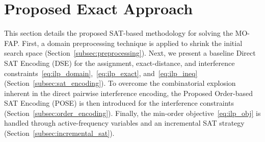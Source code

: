 {%
}
\caption{Visualization of the four relative positions between the forbidden interval $[D_{v,j}-d_{vw},D_{v,j}+d_{vw}]$ and the domain $D_w$. Red segments denote forbidden frequencies of $w$, whereas green segments denote admissible frequencies. Cases 1--3 are encoded by the boundary implications in~\eqref{eq:forbid_1}--\eqref{eq:forbid_3}. In Case 4, all frequencies in $D_w$ are forbidden, so $D_{v,j}$ is removed from $D_v$ by preprocessing.}


\section{Proposed Exact Approach}
\label{sec:method}
This section details the proposed SAT-based methodology for solving the MO-FAP.
First, a domain preprocessing technique is applied to shrink the initial search space (Section~\ref{subsec:preprocessing}).
Next, we present a baseline Direct SAT Encoding (DSE) for the assignment, exact-distance, and interference constraints~\eqref{eq:ilp_domain},~\eqref{eq:ilp_exact}, and~\eqref{eq:ilp_ineq} (Section~\ref{subsec:sat_encoding}).
To overcome the combinatorial explosion inherent in the direct pairwise interference encoding, the Proposed Order-based SAT Encoding (POSE) is then introduced for the interference constraints (Section~\ref{subsec:order_encoding}).
Finally, the min-order objective~\eqref{eq:ilp_obj} is handled through active-frequency variables and an incremental SAT strategy (Section~\ref{subsec:incremental_sat}).

